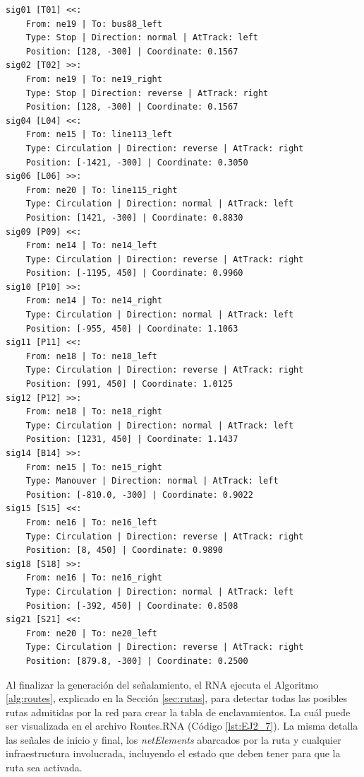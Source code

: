 	\begin{lstlisting}[language = {}, caption = Signalling.RNA, label = {lst:EJ2_6}]
sig01 [T01] <<:
	From: ne19 | To: bus88_left
	Type: Stop | Direction: normal | AtTrack: left 
	Position: [128, -300] | Coordinate: 0.1567
sig02 [T02] >>:
	From: ne19 | To: ne19_right
	Type: Stop | Direction: reverse | AtTrack: right 
	Position: [128, -300] | Coordinate: 0.1567
sig04 [L04] <<:
	From: ne15 | To: line113_left
	Type: Circulation | Direction: reverse | AtTrack: right 
	Position: [-1421, -300] | Coordinate: 0.3050
sig06 [L06] >>:
	From: ne20 | To: line115_right
	Type: Circulation | Direction: normal | AtTrack: left 
	Position: [1421, -300] | Coordinate: 0.8830
sig09 [P09] <<:
	From: ne14 | To: ne14_left
	Type: Circulation | Direction: reverse | AtTrack: right 
	Position: [-1195, 450] | Coordinate: 0.9960
sig10 [P10] >>:
	From: ne14 | To: ne14_right
	Type: Circulation | Direction: normal | AtTrack: left 
	Position: [-955, 450] | Coordinate: 1.1063
sig11 [P11] <<:
	From: ne18 | To: ne18_left
	Type: Circulation | Direction: reverse | AtTrack: right 
	Position: [991, 450] | Coordinate: 1.0125
sig12 [P12] >>:
	From: ne18 | To: ne18_right
	Type: Circulation | Direction: normal | AtTrack: left 
	Position: [1231, 450] | Coordinate: 1.1437
sig14 [B14] >>:
	From: ne15 | To: ne15_right
	Type: Manouver | Direction: normal | AtTrack: left 
	Position: [-810.0, -300] | Coordinate: 0.9022
sig15 [S15] <<:
	From: ne16 | To: ne16_left
	Type: Circulation | Direction: reverse | AtTrack: right 
	Position: [8, 450] | Coordinate: 0.9890
sig18 [S18] >>:
	From: ne16 | To: ne16_right
	Type: Circulation | Direction: normal | AtTrack: left 
	Position: [-392, 450] | Coordinate: 0.8508
sig21 [S21] <<:
	From: ne20 | To: ne20_left
	Type: Circulation | Direction: reverse | AtTrack: right 
	Position: [879.8, -300] | Coordinate: 0.2500
	\end{lstlisting}
	
	Al finalizar la generación del señalamiento, el RNA ejecuta el Algoritmo \ref{alg:routes}, explicado en la Sección \ref{sec:rutas}, para detectar todas las posibles rutas admitidas por la red para crear la tabla de enclavamientos. La cuál puede ser visualizada en el archivo Routes.RNA (Código \ref{lst:EJ2_7}). La misma detalla las señales de inicio y final, los \textit{netElements} abarcados por la ruta y cualquier infraestructura involucrada, incluyendo el estado que deben tener para que la ruta sea activada.
	
